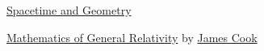 \documentclass[11pt]{article}
\begin{document}
	\kaishu 
	\setcounter{section}{0}
	\begin{center}
		{\LARGE  \href{https://www.preposterousuniverse.com/spacetimeandgeometry/}{Spacetime and Geometry}}
	\end{center}
\setcounter{page}{1}

\vspace{-0.75cm}

\begin{center}
	{\large  \href{https://www.youtube.com/playlist?list=PLBY4G2o7DhF3L9RzG0NuUnRlm8eqEUkhe}{Mathematics of General Relativity} by {\large \href{http://www.supermath.info/}{James Cook}}}
\end{center}

\vspace{-1cm}
\end{document}
